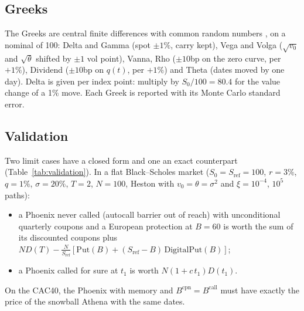 \documentclass[11pt,a4paper]{article}
\newcommand{\Sref}{S_{\mathrm{ref}}}
\begin{document}
\subsection{Greeks}
The Greeks are central finite differences with common random numbers \cite{glasserman2004}, on a nominal of 100:
Delta and Gamma (spot $\pm 1\%$, carry kept), Vega and Volga ($\sqrt{v_0}$ and $\sqrt{\theta}$ shifted by
$\pm 1$ vol point), Vanna, Rho ($\pm 10$bp on the zero curve, per $+1\%$), Dividend ($\pm 10$bp on $q(t)$, per
$+1\%$) and Theta (dates moved by one day). Delta is given per index point: multiply by $S_0/100 = 80.4$ for the
value change of a 1\% move. Each Greek is reported with its Monte Carlo standard error.

\subsection{Validation}
Two limit cases have a closed form and one an exact counterpart (Table~\ref{tab:validation}). In a flat
Black--Scholes market ($S_0 = \Sref = 100$, $r = 3\%$, $q = 1\%$, $\sigma = 20\%$, $T = 2$, $N = 100$, Heston with
$v_0 = \theta = \sigma^2$ and $\xi = 10^{-4}$, $10^5$ paths):
\begin{itemize}
\item a Phoenix never called (autocall barrier out of reach) with unconditional quarterly coupons and a European
protection at $B = 60$ is worth the sum of its discounted coupons plus
$N D(T) - \frac{N}{\Sref}\left[\mathrm{Put}(B) + (\Sref - B)\,\mathrm{DigitalPut}(B)\right]$;
\item a Phoenix called for sure at $t_1$ is worth $N(1 + c\,t_1) D(t_1)$.
\end{itemize}
On the CAC40, the Phoenix with memory and $B^{\mathrm{cpn}} = B^{\mathrm{call}}$ must have exactly the price of the
snowball Athena with the same dates.

\begin{table}[h]
\centering
{}
\caption{Validation of the pricer.}
\label{tab:validation}
\end{table}
\end{document}

